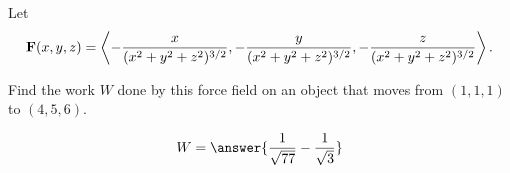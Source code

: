 \documentclass{ximera}
\author{David Guichard \and Neal Koblitz \and H. Jerome Keisler \and Albert Scheller \and Barry Balof \and Mike Wills \and Matthew Carr}
\begin{document}
\begin{exercise}




Let \[\mathbf{F}(x,y,z)=\left\langle -\frac{x}{(x^2+y^2+z^2)^{3/2}},-\frac{y}{(x^2+y^2+z^2)^{3/2}},-\frac{z}{(x^2+y^2+z^2)^{3/2}}\right\rangle\ldotp\] 

Find the work $W$ done by this force field on an object that moves from $(1,1,1)$ to $(4,5,6)$. 

\begin{prompt}
\[
W=\answer{\frac{1}{\sqrt{77}}-\frac{1}{\sqrt{3}}}
\]
\end{prompt}

\end{exercise}
\end{document}
